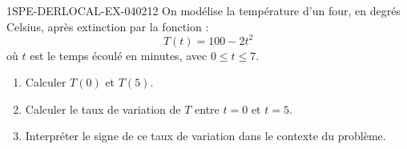 \begin{exercice}{1SPE-DERLOCAL-EX-040}{2}{12}
On modélise la température d'un four, en degrés Celsius, après extinction par la fonction :
\[
T(t) = 100 - 2t^2
\]
où $t$ est le temps écoulé en minutes, avec $0 \leqslant t \leqslant 7$.
\begin{enumerate}
\item Calculer $T(0)$ et $T(5)$.
\item Calculer le taux de variation de $T$ entre $t = 0$ et $t = 5$.
\item Interpréter le signe de ce taux de variation dans le contexte du problème.
\end{enumerate}
\end{exercice}
